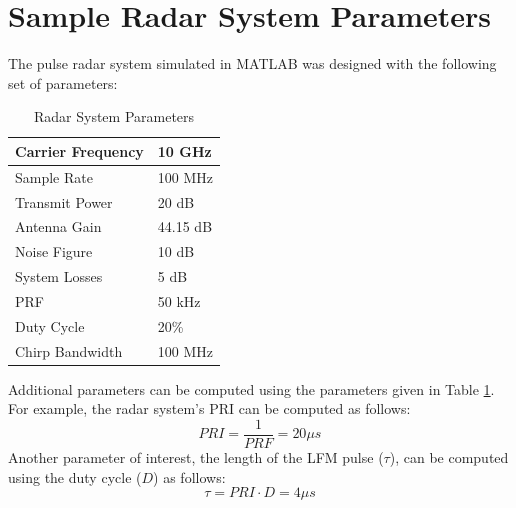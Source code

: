 \documentclass[conference]{IEEEtran}
\begin{document}
\section{Sample Radar System Parameters}
The pulse radar system simulated in MATLAB was designed with the following set of parameters: 
\begin{table}[H]
\caption{Radar System Parameters}
\label{Parameter Table}
\begin{tabularx}{0.5\textwidth}{| X | X |}
\hline
Carrier Frequency & 10 GHz \\
\hline
Sample Rate & 100 MHz \\
\hline
Transmit Power & 20 dB \\
\hline
Antenna Gain & 44.15 dB \\
\hline
Noise Figure & 10 dB \\
\hline 
System Losses & 5 dB \\
\hline
PRF & 50 kHz \\
\hline
Duty Cycle & 20\% \\
\hline
Chirp Bandwidth & 100 MHz \\
\hline
\end{tabularx}
\end{table}
\noindent
Additional parameters can be computed using the parameters given in Table \ref{Parameter Table}. For example, the radar system's PRI can be computed as follows:
\begin{equation}
PRI = \frac{1}{PRF} = 20 {\mu}s
\label{PRI Equation}
\end{equation}
Another parameter of interest, the length of the LFM pulse ($\tau$), can be computed using the duty cycle ($D$) as follows:
\begin{equation}
\tau = PRI \cdot D = 4 {\mu}s
\label{tau equation}
\end{equation}
\end{document}
